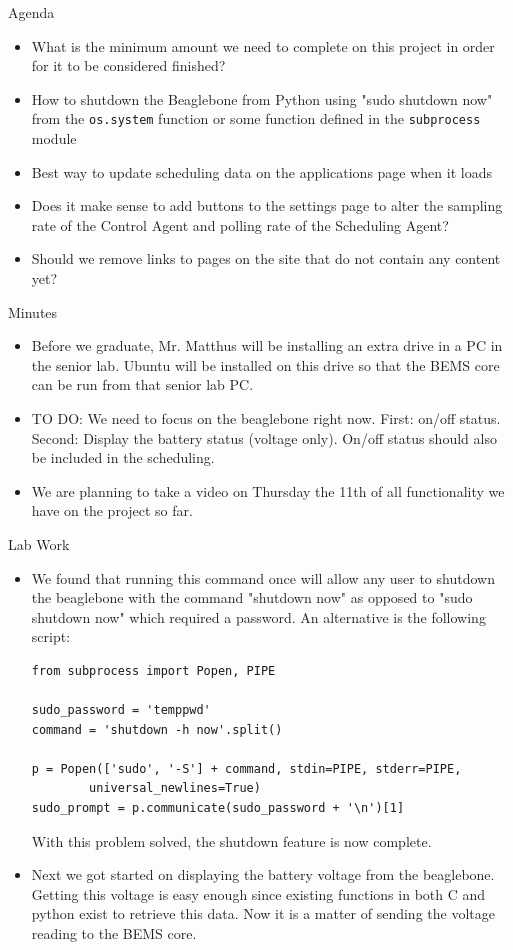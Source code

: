 \documentclass[fontsize=11pt, %
                             paper=letter, %
                             openany, %
                             captions=tableheading,
                             index=totoc,
                             hyperref]{labbook}
\begin{document}
Agenda
\begin{itemize}
\item What is the minimum amount we need to complete on this project in order for it to be considered finished?
\item How to shutdown the Beaglebone from Python using "sudo shutdown now" from the \texttt{os.system} function or some function defined in the \texttt{subprocess} module
\item Best way to update scheduling data on the applications page when it loads
\item Does it make sense to add buttons to the settings page to alter the sampling rate of the Control Agent and polling rate of the Scheduling Agent?
\item Should we remove links to pages on the site that do not contain any content yet?
\end{itemize}

Minutes
\begin{itemize}
\item Before we graduate, Mr. Matthus will be installing an extra drive in a PC in the senior lab. Ubuntu will be installed on this drive so that the BEMS core can be run from that senior lab PC.
\item TO DO: We need to focus on the beaglebone right now. First: on/off status. Second: Display the battery status (voltage only). On/off status should also be included in the scheduling.
\item We are planning to take a video on Thursday the 11th of all functionality we have on the project so far.
\end{itemize}

Lab Work
\begin{itemize}
\item We found that running this command once will allow any user to shutdown the beaglebone with the command "shutdown now" as opposed to "sudo shutdown now" which required a password. An alternative is the following script:

\begin{Verbatim}
from subprocess import Popen, PIPE

sudo_password = 'temppwd'
command = 'shutdown -h now'.split()

p = Popen(['sudo', '-S'] + command, stdin=PIPE, stderr=PIPE, 
		universal_newlines=True)
sudo_prompt = p.communicate(sudo_password + '\n')[1]
\end{Verbatim}

With this problem solved, the shutdown feature is now complete.
\item Next we got started on displaying the battery voltage from the beaglebone. Getting this voltage is easy enough since existing functions in both C and python exist to retrieve this data. Now it is a matter of sending the voltage reading to the BEMS core.
\end{itemize}
\end{document}
